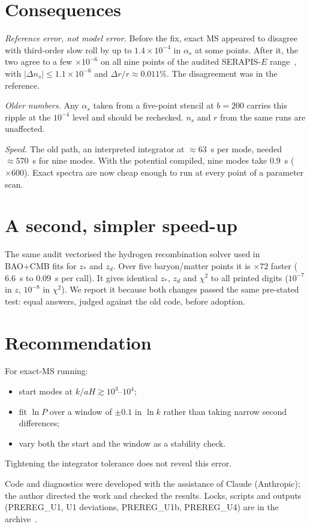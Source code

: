\documentclass[aps,prd,twocolumn,superscriptaddress,nofootinbib,showkeys]{revtex4-2}
\begin{document}
\section{Consequences}
\emph{Reference error, not model error.} Before the fix, exact MS appeared to disagree with third-order slow roll by up to $1.4\times10^{-4}$ in $\alpha_s$ at some points. After it, the two agree to a few $\times10^{-6}$ on all nine points of the audited SERAPIS-$E$ range~\cite{P5}, with $|\Delta n_s|\le1.1\times10^{-6}$ and $\Delta r/r\approx0.011\%$. The disagreement was in the reference.

\emph{Older numbers.} Any $\alpha_s$ taken from a five-point stencil at $b=200$ carries this ripple at the $10^{-4}$ level and should be rechecked. $n_s$ and $r$ from the same runs are unaffected.

\emph{Speed.} The old path, an interpreted integrator at $\approx63$~s per mode, needed $\approx570$~s for nine modes. With the potential compiled, nine modes take $0.9$~s ($\times600$). Exact spectra are now cheap enough to run at every point of a parameter scan.

\section{A second, simpler speed-up}
The same audit vectorised the hydrogen recombination solver used in BAO+CMB fits for $z_*$ and $z_d$. Over five baryon/matter points it is $\times72$ faster ($6.6$~s to $0.09$~s per call). It gives identical $z_*$, $z_d$ and $\chi^2$ to all printed digits ($10^{-7}$ in $z$, $10^{-8}$ in $\chi^2$). We report it because both changes passed the same pre-stated test: equal answers, judged against the old code, before adoption.

\section{Recommendation}
For exact-MS running:
\begin{itemize}
\item start modes at $k/aH\gtrsim10^3$--$10^4$;
\item fit $\ln P$ over a window of $\pm0.1$ in $\ln k$ rather than taking narrow second differences;
\item vary both the start and the window as a stability check.
\end{itemize}
Tightening the integrator tolerance does not reveal this error.

\begin{acknowledgments}
Code and diagnostics were developed with the assistance of Claude (Anthropic); the author directed the work and checked the results. Locks, scripts and outputs (PREREG\_U1, U1 deviations, PREREG\_U1b, PREREG\_U4) are in the archive~\cite{AEGIS}.
\end{acknowledgments}
\end{document}
